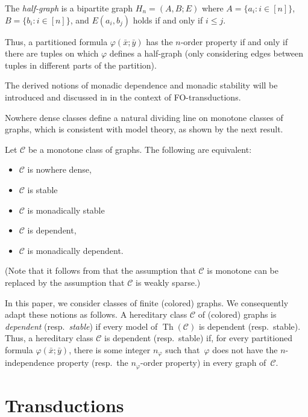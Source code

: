 \documentclass{lmcs}
\newcommand{\Cc}{\mathscr{C}}
\renewcommand{\phi}{\varphi}
\renewcommand{\FO}{{\rm FO}}
\theoremstyle{definition}
\DeclareMathOperator{\Th}{\text{Th}}
\begin{document}
\begin{defi} \label{def:halfgraph}
	The {\em half-graph} is a bipartite graph $H_n = (A, B; E)$ where $A = \{a_i : i \in [n]\}$, $B = \{b_i : i \in [n] \}$, and $E(a_i, b_j)$ holds if and only if $i \leq j$.
	\end{defi}

Thus, a partitioned formula $\phi(\bar x; \bar y)$ has the $n$-order property if and only if there are tuples on which $\phi$ defines a half-graph (only considering edges between tuples in different parts of the partition).

The derived notions of monadic dependence and monadic stability will be introduced and discussed in  in the context of \FO-transductions.

Nowhere dense classes define a natural dividing line on monotone classes of graphs, which is consistent with model theory, as shown by the next result.

\begin{thmC}
	\label{thm:adler}
	Let $\Cc$ be a monotone class of graphs. The following are equivalent:
	\begin{itemize}
		\item $\Cc$ is nowhere dense,
		\item $\Cc$ is stable
		\item $\Cc$ is monadically stable
		\item $\Cc$ is dependent,
		\item $\Cc$ is monadically dependent.
	\end{itemize}
\end{thmC}
(Note that it follows from \cite{DVORAK2018143} that the assumption that $\Cc$ is monotone can be replaced by the assumption that $\Cc$ is weakly sparse.)



In this paper, we consider classes of finite (colored) graphs. We consequently adapt these notions as follows.
A hereditary class $\Cc$ of (colored) graphs is \emph{dependent} (resp.\ \emph{stable}) if every model of $\Th(\Cc)$ is dependent (resp.\ stable).
Thus, a hereditary class $\Cc$ is 
dependent (resp.\ stable) if, for every partitioned formula $\phi(\bar x;\bar y)$, there is some integer $n_\phi$ such that~$\phi$ does not have the $n$-independence property (resp.\ the $n_\phi$-order property) in every graph of~$\Cc$. 


\part{Transductions}
\label{part:trans}
\end{document}
